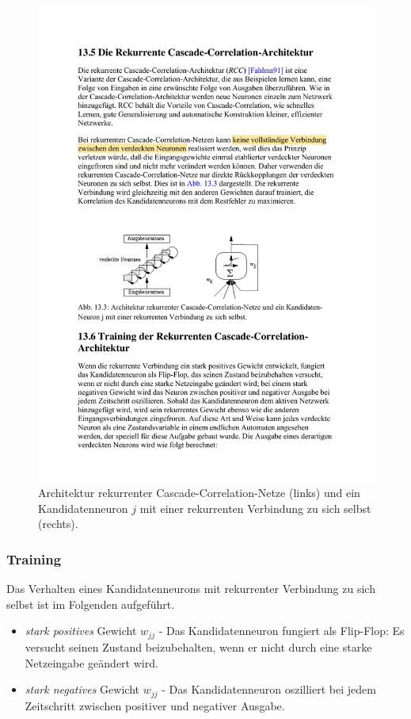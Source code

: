 \begin{figure}[ht!] \centering 
	\includegraphics[width=\linewidth]{figures/ch06_rcc.pdf}
	\caption{Architektur rekurrenter Cascade-Correlation-Netze (links) und ein Kandidatenneuron $j$ mit einer rekurrenten Verbindung zu sich selbst (rechts).}
	\label{fig:ch06_2-rcc}
\end{figure}


\subsubsection*{Training}
Das Verhalten eines Kandidatenneurons mit rekurrenter Verbindung zu sich selbst ist im Folgenden aufgeführt.

\begin{itemize}
	\item \emph{stark positives} Gewicht $w_{jj}$ - Das Kandidatenneuron fungiert als Flip-Flop: Es versucht seinen Zustand beizubehalten, wenn er nicht durch eine starke Netzeingabe geändert wird.
	\item \emph{stark negatives} Gewicht $w_{jj}$ - Das Kandidatenneuron oszilliert bei jedem Zeitschritt zwischen positiver und negativer Ausgabe. 
\end{itemize}

